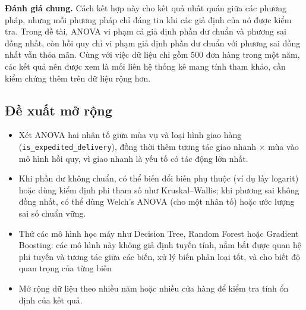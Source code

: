 \textbf{Đánh giá chung.} Cách kết hợp này cho kết quả nhất quán giữa các phương pháp, nhưng mỗi phương pháp chỉ đáng tin khi các giả định của nó được kiểm tra. Trong đề tài, ANOVA vi phạm cả giả định phần dư chuẩn và phương sai đồng nhất, còn hồi quy chỉ vi phạm giả định phần dư chuẩn với phương sai đồng nhất vẫn thỏa mãn. Cùng với việc dữ liệu chỉ gồm $500$ đơn hàng trong một năm, các kết quả nên được xem là mối liên hệ thống kê mang tính tham khảo, cần kiểm chứng thêm trên dữ liệu rộng hơn.

\subsection{Đề xuất mở rộng}
\begin{itemize}
    \item Xét ANOVA hai nhân tố giữa mùa vụ và loại hình giao hàng (\texttt{is\_\allowbreak expedited\_\allowbreak delivery}), đồng thời thêm tương tác giao nhanh $\times$ mùa vào mô hình hồi quy, vì giao nhanh là yếu tố có tác động lớn nhất.
    \item Khi phần dư không chuẩn, có thể biến đổi biến phụ thuộc (ví dụ lấy logarit) hoặc dùng kiểm định phi tham số như Kruskal--Wallis; khi phương sai không đồng nhất, có thể dùng Welch's ANOVA (cho một nhân tố) hoặc ước lượng sai số chuẩn vững.
    \item Thử các mô hình học máy như Decision Tree, Random Forest hoặc Gradient Boosting: các mô hình này không giả định tuyến tính, nắm bắt được quan hệ phi tuyến và tương tác giữa các biến, xử lý biến phân loại tốt, và cho biết độ quan trọng của từng biến
    \item Mở rộng dữ liệu theo nhiều năm hoặc nhiều cửa hàng để kiểm tra tính ổn định của kết quả.
\end{itemize}